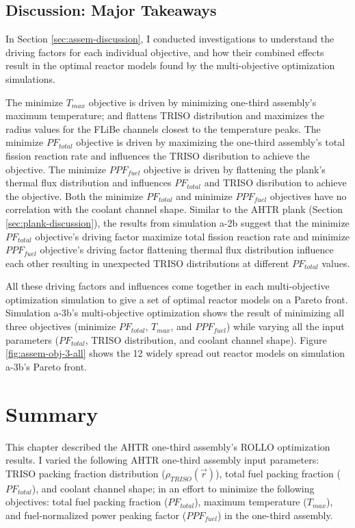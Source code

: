 \subsection{Discussion: Major Takeaways}
In Section \ref{sec:assem-discussion}, I conducted investigations to understand the 
driving factors for each individual objective, and how their combined effects 
result in the optimal reactor models found by the multi-objective optimization 
simulations. 

The minimize $T_{max}$ objective is driven by minimizing one-third assembly's 
maximum temperature; and flattens TRISO distribution and maximizes the radius values 
for the FLiBe channels closest to the temperature peaks.
The minimize $PF_{total}$ objective is driven by maximizing the one-third assembly's 
total fission reaction rate and influences the TRISO disribution to achieve the objective. 
The minimize $PPF_{fuel}$ objective is driven by flattening the plank's thermal flux
distribution and influences $PF_{total}$ and TRISO disribution to achieve the objective. 
Both the minimize $PF_{total}$ and minimize $PPF_{fuel}$ objectives have no correlation 
with the coolant channel shape. 
Similar to the \gls{AHTR} plank (Section \ref{sec:plank-discussion}), the results 
from simulation a-2b suggest that the minimize $PF_{total}$ objective's driving factor 
maximize total fission reaction rate and minimize $PPF_{fuel}$ objective's driving factor 
flattening thermal flux distribution influence each other resulting in unexpected TRISO 
distributions at different $PF_{total}$ values. 

All these driving factors and influences come together in each multi-objective 
optimization simulation to give a set of optimal reactor models on a Pareto front. 
Simulation a-3b's multi-objective optimization shows the result of minimizing all 
three objectives (minimize $PF_{total}$, $T_{max}$, and $PPF_{fuel}$) while varying 
all the input parameters ($PF_{total}$, TRISO distribution, and coolant channel shape).
Figure \ref{fig:assem-obj-3-all} shows the 12 widely spread out reactor models on 
simulation a-3b's Pareto front. 

\section{Summary}
\glsresetall
This chapter described the \gls{AHTR} one-third assembly's \gls{ROLLO} optimization 
results. 
I varied the following \gls{AHTR} one-third assembly input parameters: \gls{TRISO} 
packing fraction distribution ($\rho_{TRISO}(\vec{r})$), total fuel packing fraction 
($PF_{total}$), and coolant channel shape; in an effort to minimize the following 
objectives: total fuel packing fraction ($PF_{total}$), maximum temperature 
($T_{max}$), and fuel-normalized power peaking factor ($PPF_{fuel}$) in the 
one-third assembly. 

